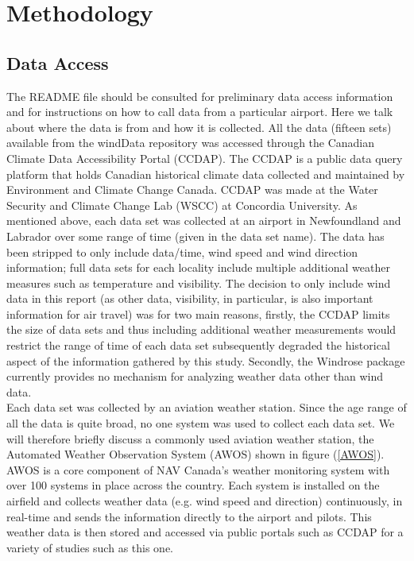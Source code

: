 \documentclass{article}
\begin{document}
\section{Methodology}\label{Methodology}

\subsection{Data Access}\label{Data_access}
The README file should be consulted for preliminary data access information and for instructions on how to call data from a particular airport. Here we talk about where the data is from and how it is 
collected. All the data (fifteen sets) available from the windData repository was accessed through the Canadian Climate Data Accessibility Portal (CCDAP). The CCDAP is a public data query platform that 
holds Canadian historical climate data collected and maintained by Environment and Climate Change Canada. CCDAP was made at the Water Security and Climate Change Lab (WSCC) at Concordia University. As 
mentioned above, each data set was collected at an airport in Newfoundland and Labrador over some range of time (given in the data set name). The data has been stripped to only include data/time, wind 
speed and wind direction information; full data sets for each locality include multiple additional weather measures such as temperature and visibility. The decision to only include wind data in this 
report (as other data, visibility, in particular, is also important information for air travel) was for two main reasons, firstly, the CCDAP limits the size of data sets and thus including additional 
weather measurements would restrict the range of time of each data set subsequently degraded the historical aspect of the information gathered by this study. Secondly, the Windrose package currently provides 
no mechanism for analyzing weather data other than wind data.
\\
\indent Each data set was collected by an aviation weather station. Since the age range of all the data is quite broad, no one system was used to collect each data set. We will therefore briefly 
discuss a commonly used aviation weather station, the Automated Weather Observation System (AWOS) shown in figure (\ref{AWOS}). AWOS is a core component of NAV Canada's weather monitoring system with 
over 100 systems in place across the country. Each system is installed on the airfield and collects weather data (e.g. wind speed and direction) continuously, in real-time and sends the information 
directly to the airport and pilots. This weather data is then stored and accessed via public portals such as CCDAP for a variety of studies such as this one. 
\end{document}

